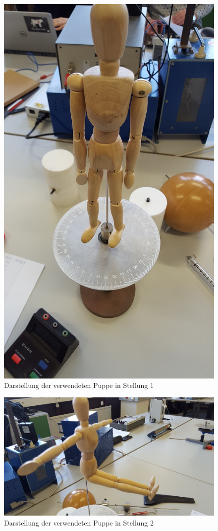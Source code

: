 \begin{figure}
    \centering
    \includegraphics[width=\textwidth/2]{images/foto_7.jpg}
    \caption{Darstellung der verwendeten Puppe in Stellung 1 \cite{V101}}
    \label{fig:puppe1}
\end{figure}

\begin{figure}
    \centering
    \includegraphics[width=\textwidth/2]{images/foto_9.jpg}
    \caption{Darstellung der verwendeten Puppe in Stellung 2 \cite{V101}}
    \label{fig:puppe2}
\end{figure}